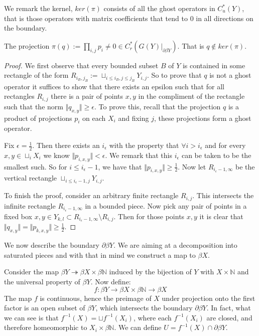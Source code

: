 We remark the kernel, $ker(\pi)$ consists of all the ghost operators in $C^{*}_{u}(Y)$, that is those operators with matrix coefficients that tend to $0$ in all directions on the boundary. 

\begin{lemma}\label{Lem:nag}
The projection $\pi(q):= \prod_{i,j}p_{i} \not = 0 \in C^{*}_{r}(G(Y)|_{\partial\beta Y})$. That is $q \not\in ker(\pi)$.
\end{lemma}
\begin{proof}
We first observe that every bounded subset $B$ of $Y$ is contained in some rectangle of the form $R_{i_{B},j_{B}}:=\sqcup_{i\leq i_{B},j\leq j_{B}}Y_{i,j}$. So to prove that $q$ is not a ghost operator it suffices to show that there exists an epsilon such that for all rectangles $R_{i,j}$ there is a pair of points $x,y$ in the compliment of the rectangle such that  the norm $\Vert q_{x,y} \Vert \geq \epsilon$. To prove this, recall that the projection $q$ is a product of projections $p_{i}$ on each $X_{i}$ and fixing $j$, these projections form a ghost operator. 

Fix $\epsilon = \frac{1}{2}$. Then there exists an $i_{\epsilon}$ with the property that $\forall i>i_{\epsilon}$ and for every $x,y \in \sqcup_{i}X_{i}$ we know $\Vert p_{i,x,y} \Vert < \epsilon$. We remark that this $i_{\epsilon}$ can be taken to be the smallest such. So for $i \leq i_{\epsilon}-1$, we have that $\Vert p_{i,x,y} \Vert \geq \frac{1}{2}$. Now let $R_{i_{\epsilon}-1,\infty}$ be the vertical rectangle $\sqcup_{i\leq i_{\epsilon}-1,j} Y_{i,j}$. 

To finish the proof, consider an arbitrary finite rectangle $R_{i,j}$. This intersects the infinite rectangle $R_{i_{\epsilon}-1,\infty}$ in a bounded piece. Now pick any pair of points in a fixed box $x,y \in Y_{k,l} \subset R_{i_{\epsilon}-1,\infty} \setminus R_{i,j}$. Then for those points $x,y$ it is clear that $\Vert q_{x,y} \Vert = \Vert p_{k,x,y}\Vert \geq \frac{1}{2}$.
\end{proof}

We now describe the boundary $\partial\beta Y$. We are aiming at a decomposition into saturated pieces and with that in mind we construct a map to $\beta X$.

Consider the map $\beta Y \twoheadrightarrow \beta X \times \beta \mathbb{N}$ induced by the bijection of $Y$ with $X \times \mathbb{N}$ and the universal property of $\beta Y$. Now define:
\begin{equation*}
f: \beta Y \rightarrow \beta X \times \beta \mathbb{N} \rightarrow \beta X
\end{equation*}
The map $f$ is continuous, hence the preimage of $X$ under projection onto the first factor is an open subset of $\beta Y$, which intersects the boundary $\partial \beta Y$. In fact, what we can see is that $f^{-1}(X)= \sqcup f^{-1}(X_{i})$, where each $f^{-1}(X_{i})$ are closed, and therefore homeomorphic to $X_{i} \times \beta \mathbb{N}$. We can define $U = f^{-1}(X)\cap \partial\beta Y$.

